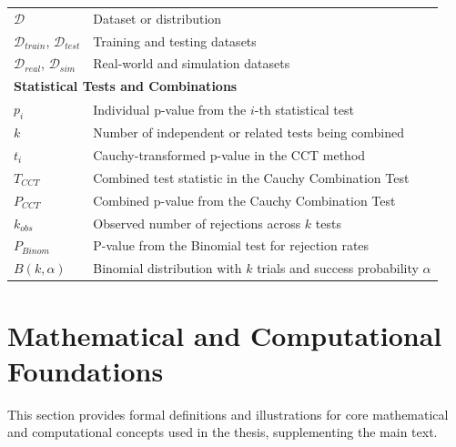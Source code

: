 \begin{appendices}
\begin{longtable}{p{}p{}}
    \midrule
    $\mathcal{D}$                               & Dataset or distribution                                                              \\
    $\mathcal{D}_{train}$, $\mathcal{D}_{test}$ & Training and testing datasets                                                        \\
    $\mathcal{D}_{real}$, $\mathcal{D}_{sim}$   & Real-world and simulation datasets                                                   \\
    \midrule
    \multicolumn{2}{l}{\textbf{Statistical Tests and Combinations}}                                                                    \\
    \midrule
    $p_i$                                       & Individual p-value from the $i$-th statistical test                                  \\
    $k$                                         & Number of independent or related tests being combined                                \\
    $t_i$                                       & Cauchy-transformed p-value in the CCT method                                         \\
    $T_{CCT}$                                   & Combined test statistic in the Cauchy Combination Test                               \\
    $P_{CCT}$                                   & Combined p-value from the Cauchy Combination Test                                    \\
    $k_{obs}$                                   & Observed number of rejections across $k$ tests                                       \\
    $P_{Binom}$                                 & P-value from the Binomial test for rejection rates                                   \\
    $B(k, \alpha)$                              & Binomial distribution with $k$ trials and success probability $\alpha$               \\
  \end{longtable}
  \endgroup


  \section{Mathematical and Computational Foundations}
  \label{app:math_foundations}

  This section provides formal definitions and illustrations for core mathematical and computational concepts used in the thesis, supplementing the main text.


\end{appendices}
